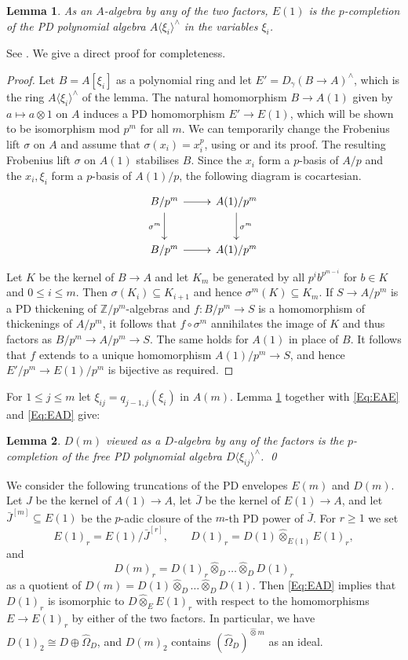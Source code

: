 \documentclass[a4paper,11pt]{article}
\theoremstyle{plain}
\newtheorem{Lemma}{Lemma}
\theoremstyle{definition}
\theoremstyle{remark}
\theoremstyle{definition}
\numberwithin{Lemma}{section}
\numberwithin{Subpoint}{Lemma}
\numberwithin{equation}{section}
\newcommand{\ZZ}{{\mathbb{Z}}}
\newcommand{\hatotimes}{\mathbin{\hat\otimes}}
\newcommand{\chang}[1]{{#1}}
\begin{document}
\begin{Lemma}
\label{Le:E(1)-xi}
As an $A$-algebra by \chang{any} of the \chang{two} factors,
$E(1)$ is the \chang{$p$-completion}
of the PD polynomial algebra $A\langle\xi_i\rangle^\wedge$ 
in the variables $\xi_i$.
\end{Lemma}

See \cite[Cor.~1.3.2]{Berthelot-Messing}.
We give a direct proof for completeness.

\begin{proof}
\chang{Let $B=A[\xi_i]$ as a polynomial ring and let $E'=D_\gamma(B\to A)^\wedge$,
which is the ring $A\langle\xi_i\rangle^\wedge$ of the lemma. The natural homomorphism $B\to A(1)$ given by $a\mapsto a\otimes 1$ on $A$ induces a PD homomorphism $E'\to E(1)$, which will be shown to be isomorphism mod $p^m$ for all $m$. 
We can temporarily change the Frobenius lift $\sigma$ on $A$ and assume that $\sigma(x_i)=x_i^p$, using \cite[Prop.~1.2.6]{Berthelot-Messing} or \cite[Lemma 1.2.2]{Jong:Crystalline} and its proof. 
The resulting Frobenius lift $\sigma$ on $A(1)$ stabilises $B$. 
Since the $x_i$ form a $p$-basis of $A/p$ and the $x_i,\xi_i$ form a $p$-basis
of $A(1)/p$, the following diagram is cocartesian.
\[
\xymatrix@M+0.2em{
B/p^m \ar[r] \ar[d]_{\sigma^m} & 
A(1)/p^m \ar[d]^{\sigma^m} \\
B/p^m \ar[r] & A(1)/p^m
}
\]
Let $K$ be the kernel of $B\to A$ and let $K_m$ be generated by all $p^ib^{p^{m-i}}$ for $b\in K$ and $0\le i\le m$. Then $\sigma(K_i)\subseteq K_{i+1}$ and hence $\sigma^m(K)\subseteq K_m$.
If $S\to A/p^m$ is a PD thickening of $\ZZ/p^m$-algebras and
$f:B/p^m\to S$ is a homomorphism of thickenings of $A/p^m$, it follows that $f\circ\sigma^m$ annihilates the image of $K$ and thus factors as $B/p^m\to A/p^m\to S$. The same holds for $A(1)$ in place of $B$.
It follows that $f$ extends to a unique homomorphism $A(1)/p^m\to S$, and hence $E'/p^m\to E(1)/p^m$ is bijective as required.}
\end{proof}

For $1\le j\le m$ let $\xi_{ij}=q_{j-1,j}(\xi_i)$ in $A(m)$.
Lemma \ref{Le:E(1)-xi} 
\chang{together with \eqref{Eq:EAE} and \eqref{Eq:EAD}}
give:

\begin{Lemma}
$D(m)$ viewed as a $D$-algebra by any of the
factors is the \chang{$p$-completion} of the free PD polynomial algebra
$D\langle\xi_{ij}\rangle^\wedge$.
\qed
\end{Lemma}

We consider the following truncations of the PD envelopes
$E(m)$ and $D(m)$.
Let $J$ be the kernel of $A(1)\to A$,
let $\bar J$ be the kernel of $E(1)\to A$, 
and let $\bar J^{[m]}\subseteq E(1)$
be the $p$-adic closure of the $m$-th PD power of $\bar J$.
For $r\ge 1$ we set
\[
E(1)_r=E(1)/\bar J^{[r]},
\qquad 
D(1)_r=D(1)\hatotimes_{E(1)}E(1)_r,
\]
and
\[
D(m)_r=D(1)_r\hatotimes_D\ldots\hatotimes_DD(1)_r
\]
as a quotient of $D(m)=D(1)\hatotimes_D\ldots\hatotimes_DD(1)$.
Then \eqref{Eq:EAD} implies that 
$D(1)_r$ is isomorphic to $D\hatotimes_EE(1)_r$ 
with respect to the homomorphisms $E\to E(1)_r$ by either of the two factors.
\chang{In particular, we have $D(1)_2\cong D\oplus\hat\Omega_D$, and $D(m)_2$ contains $(\hat\Omega_D)^{\hat\otimes m}$ as an ideal.}
\end{document}
